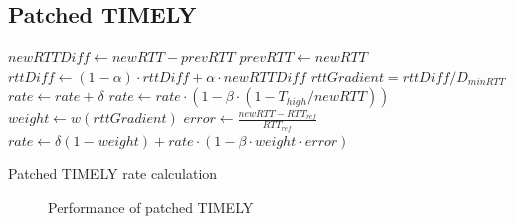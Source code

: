\vspace{-0.7em}
\subsection {Patched TIMELY}
\label{sec:timely_fixed}


\begin{algorithm}[t]
\footnotesize
{
\begin{algorithmic}[1]
\State $newRTTDiff \gets newRTT - prevRTT$
\State $prevRTT \gets newRTT$
\State $rttDiff \gets (1-\alpha) \cdot rttDiff + \alpha \cdot newRTTDiff$
\State $rttGradient = rttDiff/D_{minRTT}$
        \State $rate \gets rate + \delta$
        \State $rate \gets rate \cdot  (1 - \beta \cdot (1 - T_{high}/newRTT))$
\Else
		\State $weight \gets w(rttGradient)$	
		\State $error \gets \frac{{newRTT - RT{T_{ref}}}}{{RT{T_{ref}}}}$
        \State $rate \gets \delta (1-weight) +  rate \cdot (1 - \beta \cdot weight  \cdot error)$
\EndIf 
\end{algorithmic}
}
\caption{Patched TIMELY rate calculation}
\label{fig:timely_fixed_algo}
\end{algorithm}

\begin{figure}[t]
\center
{}
\vspace{-0.5em}
\caption{Performance of patched TIMELY}
\vspace{-0.5em}
\label{fig:timely_fixed}
\end{figure}

